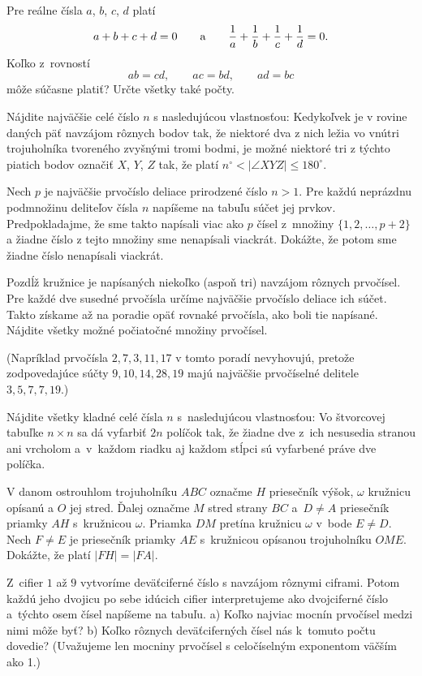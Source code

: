 {%
Pre reálne čísla $a$, $b$, $c$, $d$ platí
$$a+b+c+d=0 \qquad\hbox{a}\qquad
\frac1a+\frac1b+\frac1c+\frac1d=0.$$
Koľko z~rovností
$$ab=cd,\qquad ac=bd,\qquad ad=bc$$
môže súčasne platiť? Určte všetky také počty.
}

{%
Nájdite najväčšie celé číslo $n$ s nasledujúcou vlastnosťou: Kedykoľvek je v rovine daných päť navzájom rôznych bodov tak, že niektoré dva z nich ležia vo vnútri trojuholníka tvoreného zvyšnými tromi bodmi, je možné niektoré tri z týchto piatich bodov označiť $X$, $Y$, $Z$ tak, že platí $n^\circ < |\angle XYZ|\le 180^\circ$.
}

{%
Nech $p$ je najväčšie prvočíslo deliace prirodzené číslo $n>1$.
Pre každú neprázdnu podmnožinu deliteľov čísla $n$ napíšeme na tabuľu súčet jej prvkov. Predpokladajme, že sme takto napísali viac ako $p$ čísel z~množiny $\{1,2,\ldots,p+2\}$ a žiadne číslo z tejto množiny sme nenapísali viackrát. Dokážte, že potom sme žiadne číslo nenapísali viackrát.
}

{%
Pozdĺž kružnice je napísaných niekoľko (aspoň tri) navzájom rôznych prvočísel. Pre každé dve susedné prvočísla určíme najväčšie prvočíslo deliace ich súčet. Takto získame až na poradie opäť rovnaké prvočísla, ako boli tie napísané.
Nájdite všetky možné počiatočné množiny prvočísel.

(Napríklad prvočísla $2,7,3,11,17$ v tomto poradí nevyhovujú, pretože zodpovedajúce súčty $9,10,14,28,19$ majú najväčšie prvočíselné delitele $3,5,7,7,19$.)
}

{%
Nájdite všetky kladné celé čísla $n$ s~nasledujúcou vlastnosťou: Vo štvorcovej tabuľke $n\times n$ sa dá vyfarbiť $2n$ políčok tak, že žiadne dve z~ich nesusedia stranou ani vrcholom a~v~každom riadku aj každom stĺpci sú vyfarbené práve dve políčka.
}

{%
V danom ostrouhlom trojuholníku $ABC$ označme $H$ priesečník výšok, $\omega$ kružnicu opísanú a $O$ jej stred. Ďalej označme $M$ stred strany $BC$ a~$D \ne A$ priesečník priamky $AH$ s~kružnicou $\omega$. Priamka $DM$ pretína kružnicu $\omega$ v~bode $E\ne D$. Nech $F\ne E$ je priesečník priamky $AE$ s~kružnicou opísanou trojuholníku $OME$.
Dokážte, že platí $|FH| = |FA|$.
}

{%
Z~cifier $1$ až $9$ vytvoríme deväťciferné číslo s navzájom rôznymi ciframi. Potom každú jeho dvojicu po sebe idúcich cifier interpretujeme ako dvojciferné číslo a~týchto osem čísel napíšeme na tabuľu.
\ite a) Koľko najviac mocnín prvočísel medzi nimi môže byť?
\ite b) Koľko rôznych deväťciferných čísel nás k~tomuto počtu dovedie?
\endgraf
(Uvažujeme len mocniny prvočísel s celočíselným exponentom väčším ako 1.)
}

